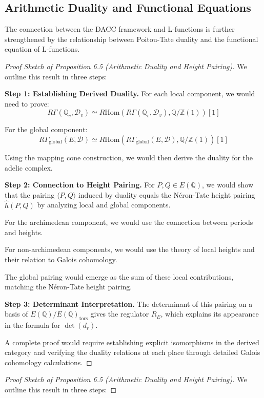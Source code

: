 \documentclass{article}
\theoremstyle{plain}
\theoremstyle{definition}
\theoremstyle{remark}
\begin{document}
\subsection{Arithmetic Duality and Functional Equations}

The connection between the DACC framework and L-functions is further strengthened by the relationship between Poitou-Tate duality and the functional equation of L-functions.

\begin{proof}[Proof Sketch of Proposition 6.5 (Arithmetic Duality and Height Pairing)]
We outline this result in three steps:
\vspace{.3cm} 

\textbf{Step 1: Establishing Derived Duality.}
For each local component, we would need to prove:
\[
R\Gamma(\mathbb{Q}_v, \mathcal{D}_v) \simeq R\text{Hom}(R\Gamma(\mathbb{Q}_v, \mathcal{D}_v), \mathbb{Q}/\mathbb{Z}(1))[1]
\]

For the global component:
\[
R\Gamma_{\text{global}}(E, \mathcal{D}) \simeq R\text{Hom}(R\Gamma_{\text{global}}(E, \mathcal{D}), \mathbb{Q}/\mathbb{Z}(1))[1]
\]

Using the mapping cone construction, we would then derive the duality for the adelic complex.
\vspace{.3cm} 

\textbf{Step 2: Connection to Height Pairing.}
For $P, Q \in E(\mathbb{Q})$, we would show that the pairing $\langle P, Q \rangle$ induced by duality equals the Néron-Tate height pairing $\hat{h}(P, Q)$ by analyzing local and global components.

For the archimedean component, we would use the connection between periods and heights.

For non-archimedean components, we would use the theory of local heights and their relation to Galois cohomology.

The global pairing would emerge as the sum of these local contributions, matching the Néron-Tate height pairing.
\vspace{.3cm} 

\textbf{Step 3: Determinant Interpretation.}
The determinant of this pairing on a basis of $E(\mathbb{Q})/E(\mathbb{Q})_{\text{tors}}$ gives the regulator $R_E$, which explains its appearance in the formula for $\det(d_r)$.

A complete proof would require establishing explicit isomorphisms in the derived category and verifying the duality relations at each place through detailed Galois cohomology calculations.
\end{proof}\begin{proof}[Proof Sketch of Proposition 6.5 (Arithmetic Duality and Height Pairing)]
We outline this result in three steps:
\vspace{.3cm} 


\end{proof}
\end{document}

